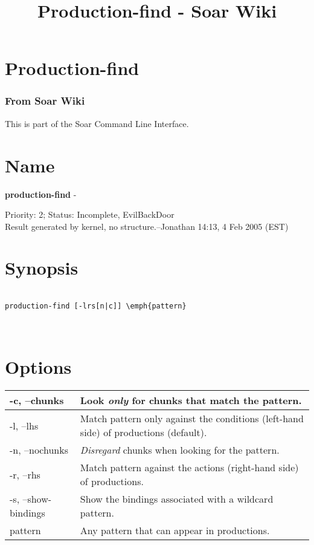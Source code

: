 \documentclass[10pt]{article}
\title{Production-find - Soar Wiki}
\begin{document}
\section*{Production-find}
\subsubsection*{From Soar Wiki}


 This is part of the Soar Command Line Interface. 
\section*{ Name }


 \textbf{production-find}
 - 


 Priority: 2; Status: Incomplete, EvilBackDoor\\ 
Result generated by kernel, no structure.--Jonathan 14:13, 4 Feb 2005 (EST) 
\section*{ Synopsis }
\begin{verbatim}

production-find [-lrs[n|c]] \emph{pattern}



\end{verbatim}
\section*{ Options }


\begin{tabular}{|p{1in}|p{5in}|}
\hline 
 -c, --chunks  & Look \emph{only}
 for chunks that match the pattern.  \\
 \hline 
 -l, --lhs  & Match pattern only against the conditions (left-hand side) of productions (default).  \\
 \hline 
 -n, --nochunks  &\emph{Disregard}
 chunks when looking for the pattern.  \\
 \hline 
 -r, --rhs  & Match pattern against the actions (right-hand side) of productions.  \\
 \hline 
 -s, --show-bindings  & Show the bindings associated with a wildcard pattern.  \\
 \hline 
 pattern  & Any pattern that can appear in productions.  \\
 \hline 

\end{tabular}
\end{document}
